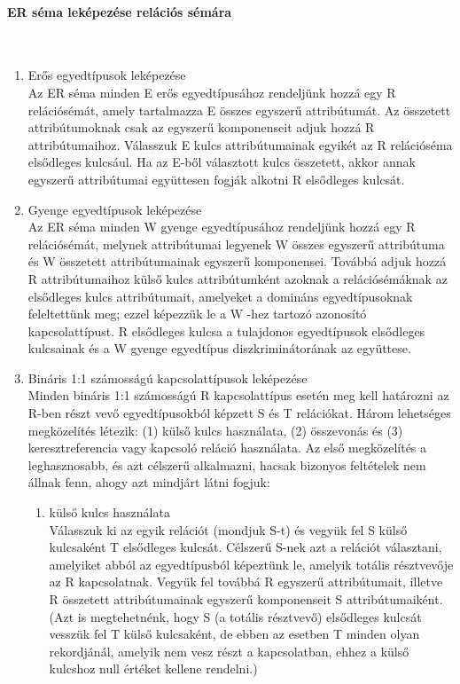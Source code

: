 \paragraph{ER séma leképezése relációs sémára}~\\
\begin{enumerate}[nosep]
	\item Erős egyedtípusok leképezése\\
	{\footnotesize Az ER séma minden E erős egyedtípusához rendeljünk hozzá egy R relációsémát, amely tartalmazza E összes egyszerű attribútumát. Az összetett attribútumoknak csak az egyszerű komponenseit adjuk hozzá R attribútumaihoz. Válasszuk E kulcs attribútumainak egyikét az R relációséma elsődleges kulcsául. Ha az E-ből választott kulcs összetett, akkor annak egyszerű attribútumai együttesen fogják alkotni R elsődleges kulcsát.}
	\item Gyenge egyedtípusok leképezése\\
	{\footnotesize Az ER séma minden W gyenge egyedtípusához rendeljünk hozzá egy R relációsémát, melynek attribútumai legyenek W összes egyszerű attribútuma és W összetett attribútumainak egyszerű komponensei. Továbbá adjuk hozzá R attribútumaihoz külső kulcs attribútumként azoknak a relációsémáknak az elsődleges kulcs attribútumait, amelyeket a domináns egyedtípusoknak feleltettünk meg; ezzel képezzük le a W -hez tartozó azonosító kapcsolattípust. R elsődleges kulcsa a tulajdonos egyedtípusok elsődleges kulcsainak és a W gyenge egyedtípus diszkriminátorának az együttese.}
	\item Bináris 1:1 számosságú kapcsolattípusok leképezése\\
	{\footnotesize Minden bináris 1:1 számosságú R kapcsolattípus esetén meg
		kell határozni az R-ben részt vevő egyedtípusokból képzett S és T relációkat. Három lehetséges megközelítés létezik: (1) külső kulcs használata, (2) összevonás és (3) keresztreferencia vagy kapcsoló reláció használata. Az első megközelítés a leghasznosabb, és azt célszerű alkalmazni, hacsak bizonyos feltételek nem állnak fenn, ahogy azt mindjárt látni fogjuk:}
	\begin{enumerate}
		\item külső kulcs használata\\
		{\footnotesize Válasszuk ki az egyik relációt (mondjuk S-t) és vegyük fel S külső kulcsaként T elsődleges kulcsát. Célszerű S-nek azt a relációt választani, amelyiket abból az egyedtípusból képeztünk le, amelyik totális résztvevője az R kapcsolatnak. Vegyük fel továbbá R egyszerű attribútumait, illetve R összetett attribútumainak egyszerű komponenseit S attribútumaiként. (Azt is megtehetnénk, hogy S (a totális résztvevő) elsődleges kulcsát vesszük fel T külső kulcsaként, de ebben az esetben T minden olyan rekordjánál, amelyik nem vesz részt a kapcsolatban, ehhez a külső kulcshoz null értéket kellene rendelni.)}

\end{enumerate}
\end{enumerate}
